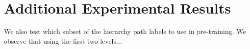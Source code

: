 \appendix
\section{Additional Experimental Results}

We also test which subset of the hierarchy path labels to use in pre-training. We observe that using the first two levels...